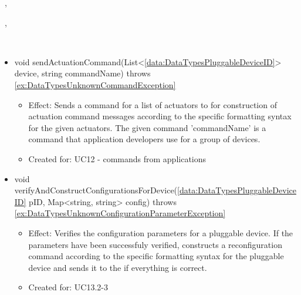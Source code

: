     \begin{description}
      \item[Provided by:] \iconcomponent{}~, \iconcomponent{}~
      \item[Required by:] \iconcomponent{}~, \iconcomponent{}~
      \item[Operations:] ~
    \begin{itemize}[noitemsep,nolistsep,leftmargin=-.25cm]
      \item \textsf{void sendActuationCommand(List\textless{}\ref{data:DataTypesPluggableDeviceID}\textgreater{} device, string commandName) throws \ref{ex:DataTypesUnknownCommandException}}
        \begin{itemize}[noitemsep,nolistsep]
           \item Effect: Sends a command for a list of actuators to  for construction of actuation command messages according to the specific formatting syntax for the given actuators. The given command 'commandName' is a command that application developers use for a group of devices.
\item Created for: UC12 - commands from applications
        \end{itemize}
      \item \textsf{void verifyAndConstructConfigurationsForDevice(\ref{data:DataTypesPluggableDeviceID} pID, Map\textless{}string, string\textgreater{} config) throws \ref{ex:DataTypesUnknownConfigurationParameterException}}
        \begin{itemize}[noitemsep,nolistsep]
           \item Effect: Verifies the configuration parameters for a pluggable device. If the parameters have been successfuly verified, constructs a reconfiguration command according to the specific formatting syntax for the pluggable device and sends it to the  if everything is correct.
\item Created for: UC13.2-3
        \end{itemize}
    \end{itemize}
    \end{description}

